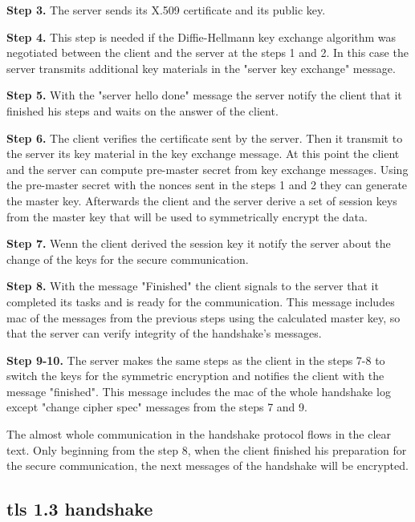 \textbf{Step 3.} The server sends its X.509 certificate and its public key.

\textbf{Step 4.} This step is needed if the Diffie-Hellmann key exchange algorithm was negotiated between the client and the server at the steps 1 and 2. In this case the server transmits additional key materials in the "server key exchange" message.

\textbf{Step 5.} With the "server hello done" message the server notify the client that it finished his steps and waits on the answer of the client.

\textbf{Step 6.} The client verifies the certificate sent by the server. Then it transmit to the server its key material in the key exchange message. 
At this point the client and the server can compute pre-master secret from key exchange messages. Using the pre-master secret with the nonces sent in the steps 1 and 2 they can generate the master key. Afterwards the client and the server derive a set of session keys from the master key that will be used to symmetrically encrypt the data.

\textbf{Step 7.} Wenn the client derived the session key it notify the server about the change of the keys for the secure communication.

\textbf{Step 8.} With the message "Finished" the client signals to the server that it completed its tasks and is ready for the communication. This message includes \gls{mac} of the messages from the previous steps using the calculated master key, so that the server can verify integrity of the handshake's messages.

\textbf{Step 9-10.} The server makes the same steps as the client in the steps 7-8 to switch the keys for the symmetric encryption and notifies the client with the message "finished". This message includes the \gls{mac} of the whole handshake log except "change cipher spec" messages from the steps 7 and 9. \cite{sslstore:handshake}\cite{Hassenstein}

The almost whole communication in the handshake protocol flows in the clear text. Only beginning from the step 8, when the client finished his preparation for the secure communication, the next messages of the handshake will be encrypted.

\subsection{\gls{tls} 1.3 handshake}
\label{subsec:handshake1_3}

